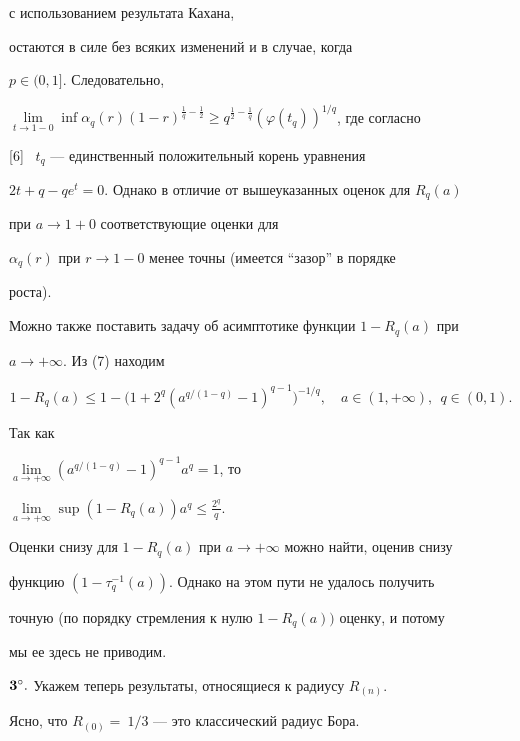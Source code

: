 с использованием результата Кахана,


остаются в силе без всяких изменений и в случае, когда


$p\in(0,1]$. Следовательно,


$\lim\limits_{t\to1-0}\inf\alpha_q(r)(1-r)^{\frac{1}{q}-\frac{1}{2}}\geq


q^{\frac{1}{2}-\frac{1}{q}}(\varphi(t_q))^{1/q}$, где согласно


[6] \ $t_q$ --- единственный положительный корень уравнения


$2t+q-qe^t=0$. Однако в отличие от вышеуказанных оценок для $R_q(a)$


при $a\to 1+0$ соответствующие оценки для


$\alpha_q(r)$ при $r\to 1-0$ менее точны (имеется ``зазор'' в порядке


роста).





Можно также поставить задачу об асимптотике функции $1-R_q(a)$ при


$a\to +\infty$. Из (7) находим


$$


1-R_q(a)\leq


1-\big(1+2^q(a^{q/(1-q)}-1)^{q-1}\big)^{-1/q}, \quad


a\in(1,+\infty),\ \ q\in(0,1).


$$


Так как


$\lim\limits_{a\to+\infty}


(a^{q/(1-q)}-1)^{q-1}a^q=1$, то


$\lim\limits_{a\to +\infty}\sup\left(1-R_q(a)\right)a^q\leq


\frac{2^q}{q}$.





Оценки снизу для $1-R_q(a)$ при $a\to +\infty$ можно найти, оценив снизу


функцию $(1-\tau^{-1}_{q}(a))$. Однако на этом пути не удалось получить


точную (по порядку стремления к нулю $1-R_q(a))$ оценку, и потому


мы ее здесь не приводим.


\medskip





${\bold 3^\circ.}$ Укажем теперь результаты, относящиеся к радиусу $R_{(n)}$.


Ясно, что $R_{(0)}=~1/3$ --- это классический радиус Бора.


